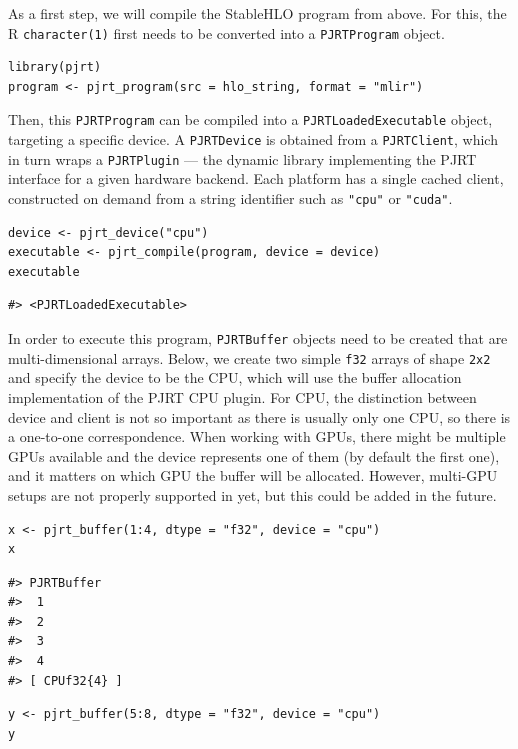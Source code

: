 As a first step, we will compile the StableHLO program from above.
For this, the R \texttt{character(1)} first needs to be converted into a \texttt{PJRTProgram} object.

\begin{verbatim}
library(pjrt)
program <- pjrt_program(src = hlo_string, format = "mlir")
\end{verbatim}

Then, this \texttt{PJRTProgram} can be compiled into a \texttt{PJRTLoadedExecutable} object, targeting a specific device.
A \texttt{PJRTDevice} is obtained from a \texttt{PJRTClient}, which in turn wraps a \texttt{PJRTPlugin} --- the dynamic library implementing the PJRT interface for a given hardware backend.
Each platform has a single cached client, constructed on demand from a string identifier such as \texttt{"cpu"} or \texttt{"cuda"}.

\begin{verbatim}
device <- pjrt_device("cpu")
executable <- pjrt_compile(program, device = device)
executable
\end{verbatim}

\begin{verbatim}
#> <PJRTLoadedExecutable>
\end{verbatim}

In order to execute this program, \texttt{PJRTBuffer} objects need to be created that are multi-dimensional arrays.
Below, we create two simple \texttt{f32} arrays of shape \texttt{2x2} and specify the device to be the CPU, which will use the buffer allocation implementation of the PJRT CPU plugin.
For CPU, the distinction between device and client is not so important as there is usually only one CPU, so there is a one-to-one correspondence.
When working with GPUs, there might be multiple GPUs available and the device represents one of them (by default the first one), and it matters on which GPU the buffer will be allocated.
However, multi-GPU setups are not properly supported in  yet, but this could be added in the future.

\begin{verbatim}
x <- pjrt_buffer(1:4, dtype = "f32", device = "cpu")
x
\end{verbatim}

\begin{verbatim}
#> PJRTBuffer 
#>  1
#>  2
#>  3
#>  4
#> [ CPUf32{4} ]
\end{verbatim}

\begin{verbatim}
y <- pjrt_buffer(5:8, dtype = "f32", device = "cpu")
y
\end{verbatim}

